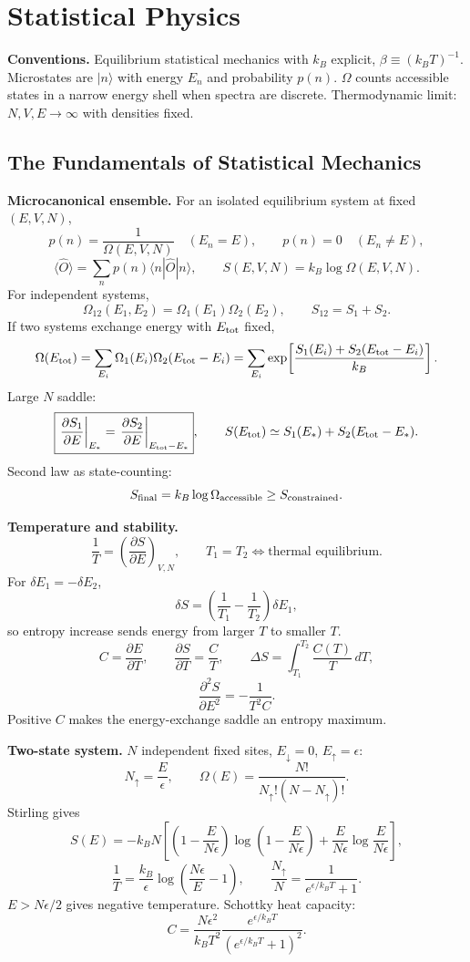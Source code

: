 \section{Statistical Physics}
\label{sec:statistical-physics}

\noindent\textbf{Conventions.}\quad
Equilibrium statistical mechanics with $k_B$ explicit,
$\beta\equiv(k_B T)^{-1}$. Microstates are $|n\rangle$ with energy
$E_n$ and probability $p(n)$. $\Omega$ counts accessible states in a narrow
energy shell when spectra are discrete. Thermodynamic limit:
$N,V,E\to\infty$ with densities fixed.

\subsection{The Fundamentals of Statistical Mechanics}

\noindent\textbf{Microcanonical ensemble.}\quad
For an isolated equilibrium system at fixed $(E,V,N)$,
\[
\boxed{p(n)=\frac{1}{\Omega(E,V,N)}}\quad(E_n=E),
\qquad
p(n)=0\quad(E_n\ne E),
\]
\[
\langle \hat O\rangle=\sum_n p(n)\langle n|\hat O|n\rangle,
\qquad
\boxed{S(E,V,N)=k_B\log\Omega(E,V,N)}.
\]
For independent systems,
\[
\Omega_{12}(E_1,E_2)=\Omega_1(E_1)\Omega_2(E_2),
\qquad S_{12}=S_1+S_2.
\]
If two systems exchange energy with $E_{\rm tot}$ fixed,
\[
\Omega(E_{\rm tot})=\sum_{E_i}\Omega_1(E_i)\Omega_2(E_{\rm tot}-E_i)
=\sum_{E_i}\exp\!\left[
\frac{S_1(E_i)+S_2(E_{\rm tot}-E_i)}{k_B}\right].
\]
Large $N$ saddle:
\[
\boxed{\left.\frac{\partial S_1}{\partial E}\right|_{E_*}
=\left.\frac{\partial S_2}{\partial E}\right|_{E_{\rm tot}-E_*}},
\qquad
S(E_{\rm tot})\simeq S_1(E_*)+S_2(E_{\rm tot}-E_*).
\]
Second law as state-counting:
\[
S_{\rm final}=k_B\log\Omega_{\rm accessible}\ge S_{\rm constrained}.
\]

\noindent\textbf{Temperature and stability.}\quad
\[
\boxed{\frac{1}{T}=\left(\frac{\partial S}{\partial E}\right)_{V,N}},
\qquad
T_1=T_2\Longleftrightarrow \text{thermal equilibrium}.
\]
For $\delta E_1=-\delta E_2$,
\[
\delta S=\left(\frac{1}{T_1}-\frac{1}{T_2}\right)\delta E_1,
\]
so entropy increase sends energy from larger $T$ to smaller $T$.
\[
C=\frac{\partial E}{\partial T},\qquad
\frac{\partial S}{\partial T}=\frac{C}{T},\qquad
\Delta S=\int_{T_1}^{T_2}\frac{C(T)}{T}\,dT,
\]
\[
\boxed{\frac{\partial^2S}{\partial E^2}=-\frac{1}{T^2C}}.
\]
Positive $C$ makes the energy-exchange saddle an entropy maximum.

\noindent\textbf{Two-state system.}\quad
$N$ independent fixed sites, $E_\downarrow=0$, $E_\uparrow=\epsilon$:
\[
N_\uparrow=\frac{E}{\epsilon},\qquad
\Omega(E)=\frac{N!}{N_\uparrow!(N-N_\uparrow)!}.
\]
Stirling gives
\[
S(E)=-k_BN\left[
\left(1-\frac{E}{N\epsilon}\right)
\log\left(1-\frac{E}{N\epsilon}\right)
+\frac{E}{N\epsilon}\log\frac{E}{N\epsilon}\right],
\]
\[
\frac{1}{T}=\frac{k_B}{\epsilon}
\log\left(\frac{N\epsilon}{E}-1\right),
\qquad
\boxed{\frac{N_\uparrow}{N}=\frac{1}{e^{\epsilon/k_BT}+1}}.
\]
$E>N\epsilon/2$ gives negative temperature. Schottky heat capacity:
\[
\boxed{C=\frac{N\epsilon^2}{k_BT^2}
\frac{e^{\epsilon/k_BT}}{\left(e^{\epsilon/k_BT}+1\right)^2}}.
\]

